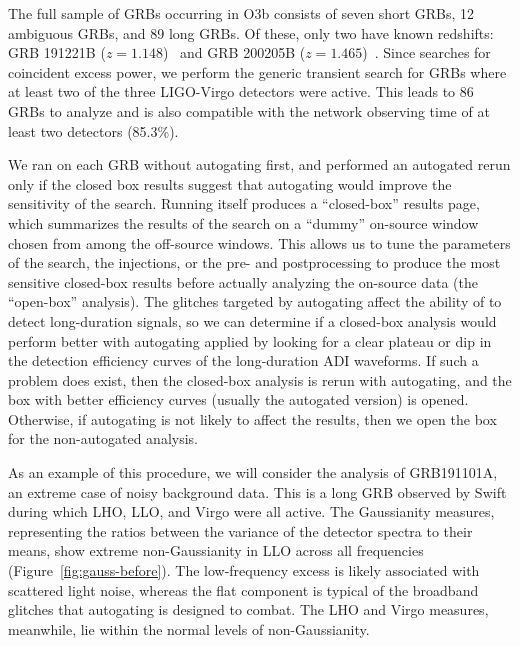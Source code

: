 The full sample of \acp{GRB} occurring in O3b consists of seven short \acp{GRB}, 12 ambiguous \acp{GRB}, and 89 long \acp{GRB}.
Of these, only two have known redshifts: GRB 191221B ($z = 1.148$)~\citep{Kuin_2019, Vielfaure_2019} and GRB 200205B ($z = 1.465$)~\citep{Vielfaure_2020}.
Since \xpip searches for coincident excess power, we perform the generic transient search for \acp{GRB} where at least two of the three LIGO-Virgo detectors were active.
This leads to 86 GRBs to analyze and is also compatible with the network observing time of at least two detectors (85.3\%).

We ran \xpip on each \ac{GRB} without autogating first, and performed an autogated rerun only if the closed box results suggest that autogating would improve the sensitivity of the search.
Running \xpip itself produces a ``closed-box'' results page, which summarizes the results of the search on a ``dummy'' on-source window chosen from among the off-source windows.
This allows us to tune the parameters of the search, the injections, or the pre- and postprocessing to produce the most sensitive closed-box results before actually analyzing the on-source data (the ``open-box'' analysis).
The glitches targeted by autogating affect the ability of \xpip to detect long-duration signals, so we can determine if a closed-box analysis would perform better with autogating applied by looking for a clear plateau or dip in the detection efficiency curves of the long-duration \ac{ADI} waveforms.
If such a problem does exist, then the closed-box analysis is rerun with autogating, and the box with better efficiency curves (usually the autogated version) is opened.
Otherwise, if autogating is not likely to affect the results, then we open the box for the non-autogated analysis.

As an example of this procedure, we will consider the analysis of GRB191101A, an extreme case of noisy background data.
This is a long GRB observed by Swift during which LHO, LLO, and Virgo were all active.
The Gaussianity measures, representing the ratios between the variance of the detector spectra to their means, show extreme non-Gaussianity in LLO across all frequencies (Figure~\ref{fig:gauss-before}).
The low-frequency excess is likely associated with scattered light noise, whereas the flat component is typical of the broadband glitches that autogating is designed to combat.
The LHO and Virgo measures, meanwhile, lie within the normal levels of non-Gaussianity.

